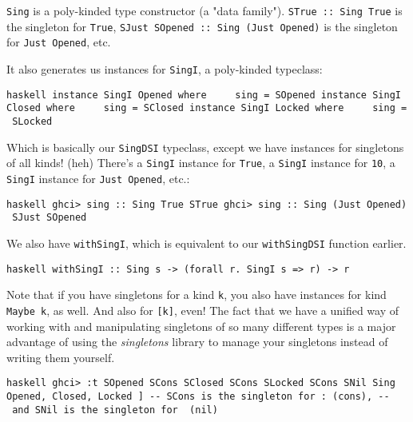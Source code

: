 \documentclass[]{article}
\begin{document}
\texttt{Sing} is a poly-kinded type constructor (a "data family").
\texttt{STrue\ ::\ Sing\ \textquotesingle{}True} is the singleton for
\texttt{\textquotesingle{}True},
\texttt{SJust\ SOpened\ ::\ Sing\ (\textquotesingle{}Just\ \textquotesingle{}Opened)}
is the singleton for \texttt{\textquotesingle{}Just\ \textquotesingle{}Opened},
etc.

It also generates us instances for \texttt{SingI}, a poly-kinded typeclass:

\texttt{haskell\ instance\ SingI\ \textquotesingle{}Opened\ where\ \ \ \ \ sing\ =\ SOpened\ instance\ SingI\ \textquotesingle{}Closed\ where\ \ \ \ \ sing\ =\ SClosed\ instance\ SingI\ \textquotesingle{}Locked\ where\ \ \ \ \ sing\ =\ SLocked}

Which is basically our \texttt{SingDSI} typeclass, except we have instances for
singletons of all kinds! (heh) There's a \texttt{SingI} instance for
\texttt{\textquotesingle{}True}, a \texttt{SingI} instance for \texttt{10}, a
\texttt{SingI} instance for
\texttt{\textquotesingle{}Just\ \textquotesingle{}Opened}, etc.:

\texttt{haskell\ ghci\textgreater{}\ sing\ ::\ Sing\ \textquotesingle{}True\ STrue\ ghci\textgreater{}\ sing\ ::\ Sing\ (\textquotesingle{}Just\ \textquotesingle{}Opened)\ SJust\ SOpened}

We also have \texttt{withSingI}, which is equivalent to our \texttt{withSingDSI}
function earlier.

\texttt{haskell\ withSingI\ ::\ Sing\ s\ -\textgreater{}\ (forall\ r.\ SingI\ s\ =\textgreater{}\ r)\ -\textgreater{}\ r}

Note that if you have singletons for a kind \texttt{k}, you also have instances
for kind \texttt{Maybe\ k}, as well. And also for \texttt{{[}k{]}}, even! The
fact that we have a unified way of working with and manipulating singletons of
so many different types is a major advantage of using the \emph{singletons}
library to manage your singletons instead of writing them yourself.

\texttt{haskell\ ghci\textgreater{}\ :t\ SOpened\ \textasciigrave{}SCons\textasciigrave{}\ SClosed\ \textasciigrave{}SCons\textasciigrave{}\ SLocked\ \textasciigrave{}SCons\textasciigrave{}\ SNil\ Sing\ \textquotesingle{}{[}\ \textquotesingle{}Opened,\ \textquotesingle{}Closed,\ \textquotesingle{}Locked\ {]}\ -\/-\ \textquotesingle{}SCons\ is\ the\ singleton\ for\ \textasciigrave{}:\textasciigrave{}\ (cons),\ -\/-\ and\ \textquotesingle{}SNil\ is\ the\ singleton\ for\ \textasciigrave{}{[}{]}\textasciigrave{}\ (nil)}
\end{document}
